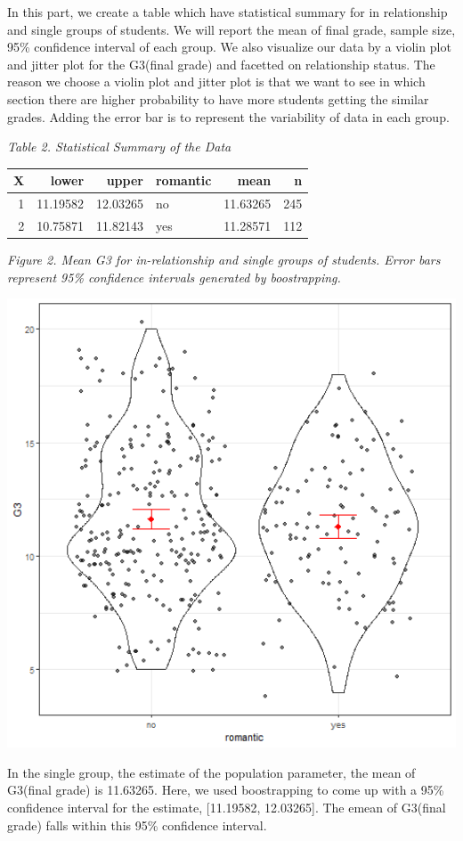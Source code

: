 \documentclass[]{article}
\begin{document}
In this part, we create a table which have statistical summary for in
relationship and single groups of students. We will report the mean of
final grade, sample size, 95\% confidence interval of each group. We
also visualize our data by a violin plot and jitter plot for the
G3(final grade) and facetted on relationship status. The reason we
choose a violin plot and jitter plot is that we want to see in which
section there are higher probability to have more students getting the
similar grades. Adding the error bar is to represent the variability of
data in each group.

\emph{Table 2. Statistical Summary of the Data}

\begin{longtable}[]{@{}rrrlrr@{}}
\toprule
X & lower & upper & romantic & mean & n\tabularnewline
\midrule
\endhead
1 & 11.19582 & 12.03265 & no & 11.63265 & 245\tabularnewline
2 & 10.75871 & 11.82143 & yes & 11.28571 & 112\tabularnewline
\bottomrule
\end{longtable}

\emph{Figure 2. Mean G3 for in-relationship and single groups of
students. Error bars represent 95\% confidence intervals generated by
boostrapping.}

\includegraphics[width=6.67in]{../results/CI_plot}

In the single group, the estimate of the population parameter, the mean
of G3(final grade) is 11.63265. Here, we used boostrapping to come up
with a 95\% confidence interval for the estimate, {[}11.19582,
12.03265{]}. The emean of G3(final grade) falls within this 95\%
confidence interval.
\end{document}
